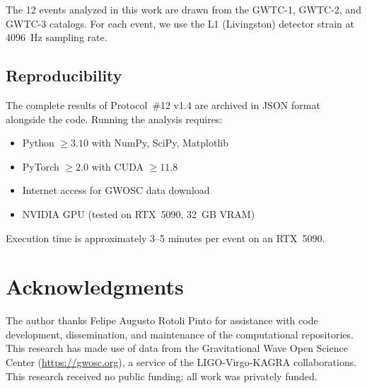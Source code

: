 \documentclass[12pt,a4paper,twocolumn]{article}
\begin{document}
The 12 events analyzed in this work are drawn from the GWTC-1, GWTC-2, and GWTC-3 catalogs. For each event, we use the L1 (Livingston) detector strain at 4096~Hz sampling rate.

\subsection{Reproducibility}

The complete results of Protocol~\#12 v1.4 are archived in JSON format alongside the code. Running the analysis requires:
\begin{itemize}[nosep]
\item Python $\geq 3.10$ with NumPy, SciPy, Matplotlib
\item PyTorch $\geq 2.0$ with CUDA $\geq 11.8$
\item Internet access for GWOSC data download
\item NVIDIA GPU (tested on RTX~5090, 32~GB VRAM)
\end{itemize}

Execution time is approximately 3--5 minutes per event on an RTX~5090.


\section*{Acknowledgments}

The author thanks Felipe Augusto Rotoli Pinto for assistance with code development, dissemination, and maintenance of the computational repositories. This research has made use of data from the Gravitational Wave Open Science Center (\url{https://gwosc.org}), a service of the LIGO-Virgo-KAGRA collaborations. This research received no public funding; all work was privately funded.
\end{document}
